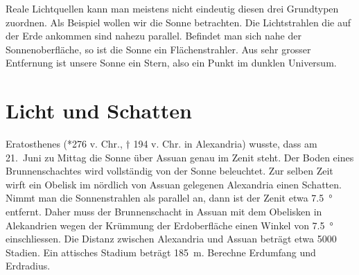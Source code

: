 \documentclass[paper=a4,twoside=true,,DIV13,BCOR1cm]{scrartcl}
\begin{document}
\vspace*{3cm}

Reale Lichtquellen kann man meistens nicht eindeutig diesen drei Grundtypen zuordnen. Als Beispiel wollen wir die
Sonne betrachten. Die Lichtstrahlen die auf der Erde ankommen sind nahezu parallel. Befindet man sich nahe der
Sonnenoberfläche, so ist die Sonne ein Flächenstrahler. Aus sehr grosser Entfernung ist unsere Sonne ein Stern,
also ein Punkt im dunklen Universum.

\section{Licht und Schatten}

\newcommand{\Schirm}[3]{\draw [DS] (#1)--(#2) node [rotate=90, above right] {#3};}
\newcommand{\SchirmR}[0]{\Schirm{INO}{ISO}{Schirm}}




\begin{aufgabe}
Eratosthenes (*276 v. Chr., $\dagger$ 194 v. Chr. in Alexandria) wusste, dass
	am 21.\ Juni zu Mittag die Sonne über Assuan genau im Zenit steht.
	Der Boden eines Brunnenschachtes wird vollständig von der Sonne beleuchtet. 
 Zur selben Zeit wirft ein Obelisk im nördlich von Assuan gelegenen Alexandria einen Schatten.
 Nimmt man die Sonnenstrahlen als parallel an, dann ist der Zenit etwa \SI{7.5}{\degree} entfernt.
 Daher muss der Brunnenschacht in Assuan mit dem Obelisken in Alekandrien wegen der
 Krümmung der Erdoberfläche einen Winkel von \SI{7.5}{\degree} einschliessen.
 Die Distanz zwischen Alexandria und Assuan beträgt etwa 5000 Stadien. Ein
 attisches Stadium beträgt \SI{185}{m}. Berechne Erdumfang und Erdradius.
\end{aufgabe}
\end{document}
